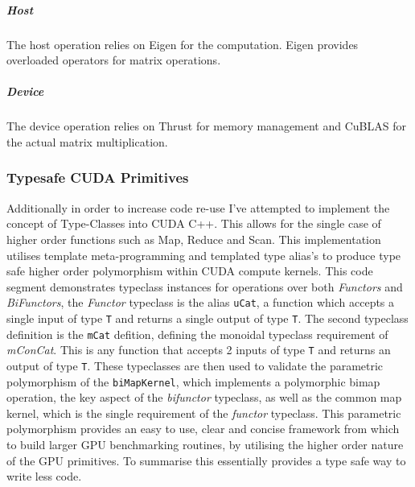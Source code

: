 \subparagraph{Host}
The host operation relies on Eigen for the computation. Eigen provides overloaded operators for
matrix operations.


\subparagraph{Device}
The device operation relies on Thrust for memory management and CuBLAS for the actual matrix
multiplication.


\subsubsection{Typesafe CUDA Primitives} 
Additionally in order to increase code re-use I've attempted to implement the concept of
Type-Classes into CUDA C++. This allows for the single case of higher order functions such as Map,
Reduce and Scan. This implementation utilises template meta-programming and templated type alias's
to produce type safe higher order polymorphism within CUDA compute kernels.
 This code segment demonstrates typeclass instances for
operations over both \textit{Functors} and \textit{BiFunctors}, the \textit{Functor} typeclass is
the alias \lstinline{uCat}, a function which accepts a single input of type \lstinline{T} and
returns a single output of type \lstinline{T}. The second typeclass definition is the
\lstinline{mCat} defition, defining the monoidal typeclass requirement of \textit{mConCat}. This is
any function that accepts 2 inputs of type \lstinline{T} and returns an output of type
\lstinline{T}. These typeclasses are then used to validate the parametric polymorphism of the
\lstinline{biMapKernel}, which implements a polymorphic bimap operation, the key aspect of the
\textit{bifunctor} typeclass, as well as the common map kernel, which is the single requirement of
the \textit{functor} typeclass. This parametric polymorphism provides an easy to use, clear and
concise framework from which to build larger GPU benchmarking routines, by utilising the higher
order nature of the GPU primitives. To summarise this essentially provides a type safe way to write
less code.
